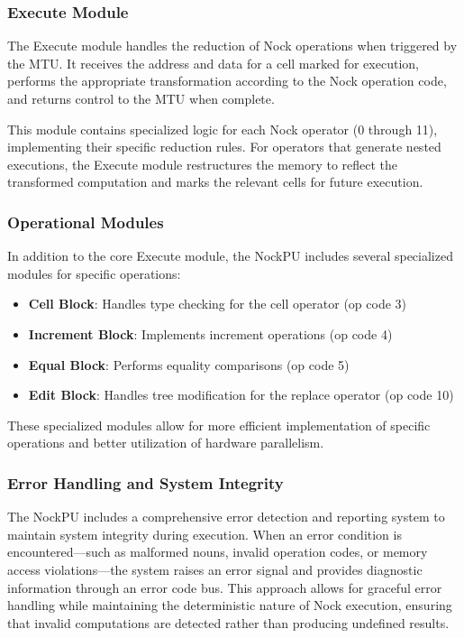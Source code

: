 \documentclass[twoside]{article}
\begin{document}
\subsubsection{Execute Module}

The Execute module handles the reduction of Nock operations when triggered by the MTU. It receives the address and data for a cell marked for execution, performs the appropriate transformation according to the Nock operation code, and returns control to the MTU when complete.

This module contains specialized logic for each Nock operator (0 through 11), implementing their specific reduction rules. For operators that generate nested executions, the Execute module restructures the memory to reflect the transformed computation and marks the relevant cells for future execution.

\subsubsection{Operational Modules}

In addition to the core Execute module, the NockPU includes several specialized modules for specific operations:

\begin{itemize}
  \item \textbf{Cell Block}: Handles type checking for the cell operator (op code 3)
  \item \textbf{Increment Block}: Implements increment operations (op code 4)
  \item \textbf{Equal Block}: Performs equality comparisons (op code 5)
  \item \textbf{Edit Block}: Handles tree modification for the replace operator (op code 10)
\end{itemize}

\noindent
These specialized modules allow for more efficient implementation of specific operations and better utilization of hardware parallelism.

\subsubsection{Error Handling and System Integrity}

The NockPU includes a comprehensive error detection and reporting system to maintain system integrity during execution. When an error condition is encountered—such as malformed nouns, invalid operation codes, or memory access violations—the system raises an error signal and provides diagnostic information through an error code bus. This approach allows for graceful error handling while maintaining the deterministic nature of Nock execution, ensuring that invalid computations are detected rather than producing undefined results.
\end{document}
